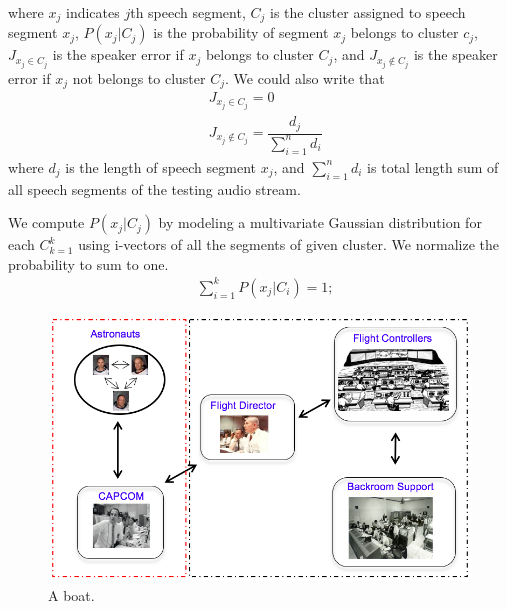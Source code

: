 \documentclass[journal]{IEEEtran}
\begin{document}
where $x_j$ indicates $j$th speech segment, $C_j$ is the cluster assigned to speech segment $x_j$, $P(x_j|C_j)$ is the probability of segment $x_j$ belongs to cluster $c_j$, $J_{x_j \in C_j} $ is the speaker error if $x_j$ belongs to cluster $C_j$, and $J_{x_j \notin C_j}$ is the speaker error if $x_j$ not belongs to cluster $C_j$. We could also write that
\begin{equation}
\begin{aligned}
&J_{x_j \in C_j} = 0 \\
&J_{x_j \notin C_j} = \dfrac{d_j}{\sum_{i=1}^{n} d_i}
\label{jj}
\end{aligned}
\end{equation} 
where $d_j$ is the length of speech segment $x_j$, and $\sum_{i=1}^{n} d_i$ is total length sum of all speech segments of the testing audio stream.

We compute $P(x_j|C_j)$ by modeling a multivariate Gaussian distribution for each $C_{k=1}^{k}$ using i-vectors of all the segments of given cluster. We normalize the probability to sum to one.
\begin{equation}
\begin{aligned}
&  \sum_{i=1}^{k} P(x_j|C_i) = 1;
\label{jj}
\end{aligned}
\end{equation}
 
\begin{figure}[t]
	\includegraphics[width=\linewidth]{figs/comm5}
	\caption{A boat.}
	\label{fig:boat1}
\end{figure}
\end{document}
